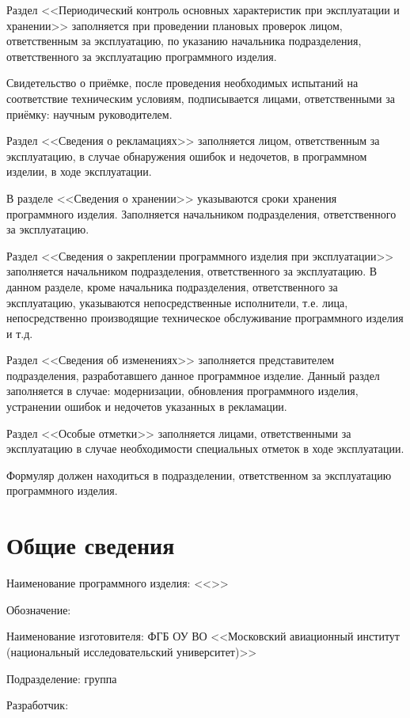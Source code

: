 \documentclass[14pt,a4paper,final]{extreport}
\begin{document}
Раздел <<Периодический контроль основных характеристик при эксплуатации и хранении>> заполняется при проведении плановых проверок лицом, ответственным за эксплуатацию, по указанию начальника подразделения, ответственного за эксплуатацию программного изделия.


Свидетельство о приёмке, после проведения необходимых испытаний на соответствие техническим условиям, подписывается лицами, ответственными за приёмку:	научным руководителем.

Раздел <<Сведения о рекламациях>> заполняется лицом, ответственным за эксплуатацию, в случае обнаружения ошибок и недочетов, в программном изделии, в ходе эксплуатации.

В разделе <<Сведения о хранении>> указываются сроки хранения программного изделия. Заполняется начальником подразделения, ответственного за эксплуатацию.

Раздел <<Сведения о закреплении программного изделия при эксплуатации>> заполняется начальником подразделения, ответственного за эксплуатацию. В данном разделе, кроме начальника подразделения, ответственного за эксплуатацию, указываются непосредственные исполнители, т.е. лица, непосредственно производящие техническое обслуживание программного изделия и т.д.

Раздел <<Сведения об изменениях>> заполняется представителем подразделения, разработавшего данное программное изделие. Данный раздел заполняется в случае: модернизации, обновления программного изделия, устранении ошибок и недочетов указанных в рекламации.

Раздел <<Особые отметки>> заполняется лицами, ответственными за эксплуатацию в случае необходимости специальных отметок в ходе эксплуатации.

Формуляр должен находиться в подразделении, ответственном за эксплуатацию программного изделия.

\chapter{Общие сведения}

Наименование программного изделия: <<\doctitleoneline>>

Обозначение: \programtitle

Наименование изготовителя: 	ФГБ ОУ ВО <<Московский авиационный институт (национальный исследовательский университет)>>

Подразделение: группа \grp

Разработчик: 	\shname
\end{document}
